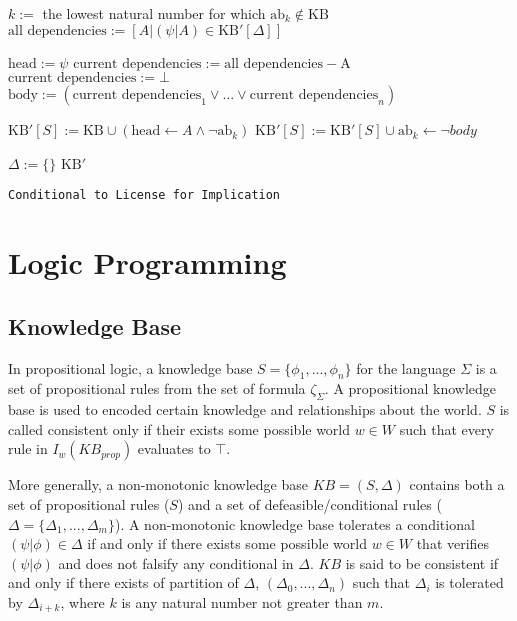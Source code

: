 \begin{algorithm}[H] \label{alg:addAB}
\SetAlgoLined
{}
{
{
$k:=$ the lowest natural number for which $\text{ab}_k \notin \text{KB}$\;
$\text{all dependencies}:= [A | (\psi|A) \in \text{KB}'[\Delta]]$\;

{
$\text{head}:=\psi$\;
$\text{current dependencies}:= \text{all dependencies} - \text{A}$\;
{
$\text{current dependencies}:=\bot$\;
}
$\text{body}:=(\text{current dependencies}_1 \lor ... \lor \text{current dependencies}_n)$\;

$\text{KB}'[S]:= \text{KB} \cup (\text{head} \leftarrow A \land \lnot \text{ab}_k)$\;
$\text{KB}'[S]:= \text{KB}'[S] \cup \text{ab}_k \leftarrow \lnot body$\;

}
}
$\Delta:=\{\}$\;
\Return $\text{KB}'$
}
\caption{\texttt{Conditional to License for Implication}}
\end{algorithm}







\section{Logic Programming}
\subsection{Knowledge Base} \label{ssec:kb}
In propositional logic, a knowledge base $S=\{\phi_1,...,\phi_n\}$ for the language $\Sigma$ is a set of propositional rules from the set of formula $\zeta_\Sigma$. A propositional knowledge base is used to encoded certain knowledge and relationships about the world. $S$ is called consistent only if their exists some possible world $w \in W$ such that every rule in $I_w(KB_{prop})$ evaluates to $\top$.

More generally, a non-monotonic knowledge base $KB=(S, \Delta)$ contains both a set of propositional rules ($S$) and a set of defeasible/conditional rules ($\Delta=\{\Delta_1,...,\Delta_m\}$). A non-monotonic knowledge base tolerates a conditional $(\psi|\phi)\in\Delta$ if and only if there exists some possible world $w\in W$ that verifies $(\psi|\phi)$ and does not falsify any conditional in $\Delta$. $KB$ is said to be consistent if and only if there exists of partition of $\Delta$, $(\Delta_0,...,\Delta_n)$ such that $\Delta_i$ is tolerated by $\Delta_{i+k}$, where $k$ is any natural number not greater than $m$. 

